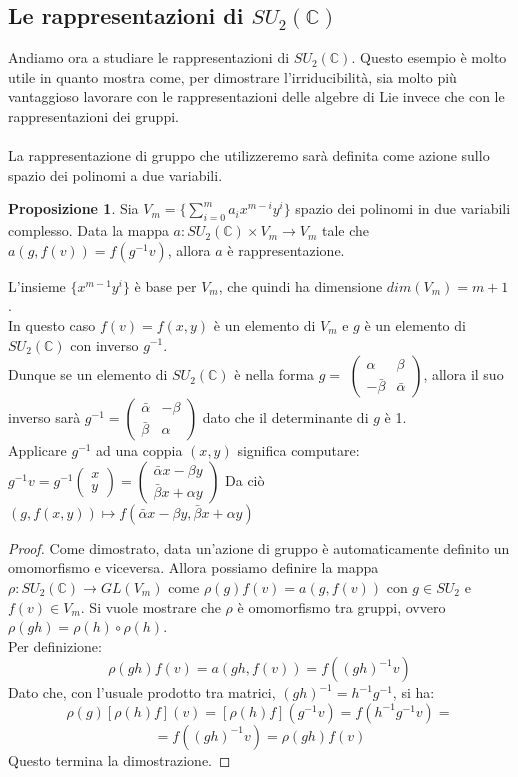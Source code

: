 \documentclass[12pt,a4paper]{report}
\theoremstyle{definition}
\newtheorem{Prop}[Def]{Proposizione}
\theoremstyle{definition}
\theoremstyle{definition}
\theoremstyle{definition}
\begin{document}
\subsection{Le rappresentazioni di $SU_2(\mathbb{C})$}
Andiamo ora a studiare le rappresentazioni di $SU_2(\mathbb{C})$. Questo esempio è molto utile in quanto mostra come, per dimostrare l'irriducibilità, sia molto più vantaggioso lavorare con le rappresentazioni delle algebre di Lie invece che con le rappresentazioni dei gruppi.\\
\\
La rappresentazione di gruppo che utilizzeremo sarà definita come azione sullo spazio dei polinomi a due variabili.
\begin{Prop}
	Sia $V_m=\{\sum_{i=0}^{m} a_ix^{m-i}y^i\}$ spazio dei polinomi in due variabili complesso. Data la mappa $a:SU_2(\mathbb{C})\times V_m\rightarrow V_m$ tale che $a(g,f(v))=f(g^{-1}v)$, allora $a$ è rappresentazione.
\end{Prop}
L'insieme $\{x^{m-1}y^i\}$ è base per $V_m$, che quindi ha dimensione $dim(V_m)=m+1$.\\
In questo caso $f(v)=f(x,y)$ è un elemento di $V_m$ e $g$ è un elemento di $SU_2(\mathbb{C})$ con inverso $g^{-1}$.\\
Dunque se un elemento di $SU_2(\mathbb{C})$ è nella forma $g=$
$\begin{pmatrix}
	\alpha&\beta\\
	-\bar{\beta}&\bar{\alpha}
\end{pmatrix}$,
allora il suo inverso sarà $g^{-1}=
\begin{pmatrix}
	\bar{\alpha}&-\beta\\
	\bar{\beta}&\alpha
\end{pmatrix}$ dato che il determinante di $g$ è 1. \\
Applicare $g^{-1}$ ad una coppia $(x,y)$ significa computare:
$g^{-1}v=g^{-1}
\begin{pmatrix}
	x\\y
\end{pmatrix}=
\begin{pmatrix}
	\bar{\alpha}x-\beta y\\
	\bar{\beta}x+\alpha y
\end{pmatrix}$
Da ciò $(g,f(x,y))\longmapsto f(\bar{\alpha}x-\beta y,\bar{\beta}x+\alpha y)$
\begin{proof}
	Come dimostrato, data un'azione di gruppo è automaticamente definito un omomorfismo e viceversa. Allora possiamo definire la mappa $\rho:SU_2(\mathbb{C})\rightarrow GL(V_m)$ come $\rho(g)f(v)=a(g,f(v))$ con $g\in SU_2$ e $f(v)\in V_m$.
	Si vuole mostrare che $\rho$ è omomorfismo tra gruppi, ovvero $\rho(gh)=\rho(h)\circ\rho(h)$.\\
	Per definizione:
	$$\rho(gh)f(v)=a(gh,f(v))=f((gh)^{-1}v)$$
	Dato che, con l'usuale prodotto tra matrici, $(gh)^{-1}=h^{-1}g^{-1}$, si ha:
	$$\rho(g)[\rho(h)f](v)=[\rho(h)f](g^{-1}v)=f(h^{-1}g^{-1}v)=$$
	$$=f((gh)^{-1}v)=\rho(gh)f(v)$$
	Questo termina la dimostrazione.
\end{proof}
\end{document}
